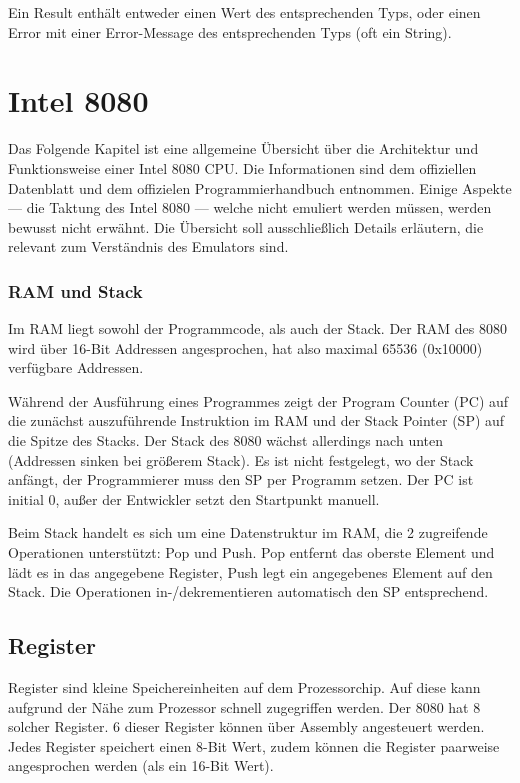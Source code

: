 Ein Result enthält entweder einen Wert des entsprechenden Typs, oder einen Error mit einer Error-Message des entsprechenden Typs (oft ein String).


\section{Intel 8080}

Das Folgende Kapitel ist eine allgemeine Übersicht über die Architektur und Funktionsweise einer Intel 8080 CPU. Die Informationen sind dem offiziellen Datenblatt\cite{datasheet} und dem offizielen Programmierhandbuch\cite{progManual} entnommen.
Einige Aspekte --- \zB die Taktung des Intel 8080 --- welche nicht emuliert werden müssen, werden bewusst nicht erwähnt. Die Übersicht soll ausschließlich Details erläutern, die relevant zum Verständnis des Emulators sind.

\subsubsection{RAM und Stack}

Im \ac{RAM} liegt sowohl der Programmcode, als auch der Stack.
Der \ac{RAM} des 8080 wird über 16-Bit Addressen angesprochen, hat also maximal 65536 (0x10000) verfügbare Addressen.

Während der Ausführung eines Programmes zeigt der Program Counter (PC) auf die zunächst auszuführende Instruktion im \ac{RAM} und der Stack Pointer (SP) auf die Spitze des Stacks. Der Stack des 8080 wächst allerdings nach unten (Addressen sinken bei größerem Stack).
Es ist nicht festgelegt, wo der Stack anfängt, der Programmierer muss den SP per Programm setzen. Der PC ist initial 0, außer der Entwickler setzt den Startpunkt manuell.

Beim Stack handelt es sich um eine Datenstruktur im \ac{RAM}, die 2 zugreifende Operationen unterstützt: Pop und Push. Pop entfernt das oberste Element und lädt es in das angegebene Register, Push legt ein angegebenes Element auf den Stack. Die Operationen in-/dekrementieren automatisch den SP entsprechend.

\subsection{Register}

Register sind kleine Speichereinheiten auf dem Prozessorchip. Auf diese kann aufgrund der Nähe zum Prozessor schnell zugegriffen werden. Der 8080 hat 8 solcher Register.
6 dieser Register können über Assembly angesteuert werden. Jedes Register speichert einen 8-Bit Wert, zudem können die Register paarweise angesprochen werden (als ein 16-Bit Wert).

